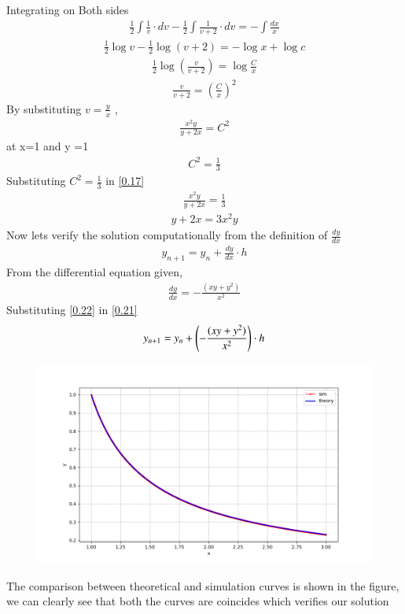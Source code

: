 \documentclass[journal]{IEEEtran}
\begin{document}
Integrating on Both sides
\begin{align}
   \frac{1}{2}\int\frac{1}{v} \cdot dv - \frac{1}{2}\int\frac{1}{v+2}\cdot dv = -\int \frac{dx}{x}
\end{align}
\begin{align}
    \frac{1}{2}\log v - \frac{1}{2}\log (v+2) = - \log{x} + \log c
\end{align}
\begin{align}
    \frac{1}{2} \log (\frac{v}{v+2}) = \log \frac{C}{x}
\end{align}
\begin{align}
    \frac{v}{v+2} = (\frac{C}{x})^2
\end{align}
By substituting $v=\frac{y}{x}$ ,
\begin{align}
    \frac{x^2 y}{y+2x} =  C^2
    \label{0.17}
\end{align}
at x=1 and y =1 
\begin{align}
    C^2 = \frac{1}{3}
\end{align}
Substituting $C^2 = \frac{1}{3}$ in \ref{0.17} 
\begin{align}
    \frac{x^2y}{y+2x} = \frac{1}{3}
\end{align}
\begin{align}
    y+2x = 3x^2y
\end{align}
Now lets verify the solution computationally from the definition of $\frac{dy}{dx}$
\begin{align}
    y_{n+1}= y_{n} + \frac{dy}{dx} \cdot h
    \label{0.21}
\end{align}
From the differential equation given,
\begin{align}
    \frac{dy}{dx} = -\frac{(xy+y^2)}{x^2}
    \label{0.22}
\end{align}
Substituting \ref{0.22} in \ref{0.21}
\begin{align}
    y_{n+1} = y_n + \left(-\frac{(xy+y^2)}{x^2}\right) \cdot h 
\end{align}
\begin{figure}
    \centering
    \includegraphics[width=\columnwidth]{figs/Figure_1.png}
\end{figure}
The comparison between theoretical and simulation curves is shown in the figure, we can clearly see that both the curves are coincides which verifies our solution
\end{document}
